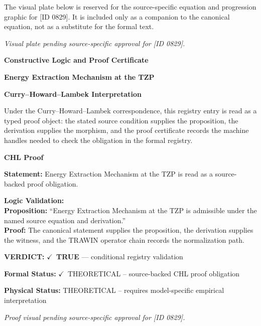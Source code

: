 \begingroup\footnotesize\sloppy
The visual plate below is reserved for the source-specific equation and progression graphic for [ID 0829]. It is included only as a companion to the canonical equation, not as a substitute for the formal text.
\par\endgroup
\begingroup\footnotesize\itshape
Visual plate pending source-specific approval for [ID 0829].
\par\endgroup

\clearpage
\begingroup\tzpsupportsetup
\noindent\textbf{\fontsize{10.8pt}{12.8pt}\selectfont [ID 0829] Constructive Logic and Proof Certificate}\par
\noindent\textbf{\fontsize{10pt}{12pt}\selectfont Energy Extraction Mechanism at the TZP}\par
\vspace{0.45em}
\begingroup
\footnotesize
\setlength{\parskip}{0.22em}
\setlength{\parindent}{0pt}
\noindent\textbf{Curry--Howard--Lambek Interpretation}\par
Under the Curry--Howard--Lambek correspondence, this registry entry is read as a typed proof
object: the stated source condition supplies the proposition, the derivation supplies the
morphism, and the proof certificate records the machine handles needed to check the obligation
in the formal registry.

\vspace{0.45em}
\noindent\textbf{CHL Proof}\par
\textbf{Statement:} Energy Extraction Mechanism at the TZP is read as a source-backed proof obligation.

\textbf{Logic Validation:}\\
\textbf{Proposition:} ``Energy Extraction Mechanism at the TZP is admissible under the named source equation and derivation.''\\
\textbf{Proof:} The canonical statement supplies the proposition, the derivation supplies the witness, and the TRAWIN operator chain records the normalization path.

\textbf{VERDICT:} \ensuremath{\checkmark}\ \textbf{TRUE} --- conditional registry validation

\textbf{Formal Status:} \ensuremath{\checkmark}\ THEORETICAL -- source-backed CHL proof obligation

\textbf{Physical Status:} THEORETICAL -- requires model-specific empirical interpretation
\par\vspace{0.45em}
\par
\vfill
\begingroup\footnotesize\itshape
Proof visual pending source-specific approval for [ID 0829].
\par\endgroup
\vfill
\endgroup
\endgroup
